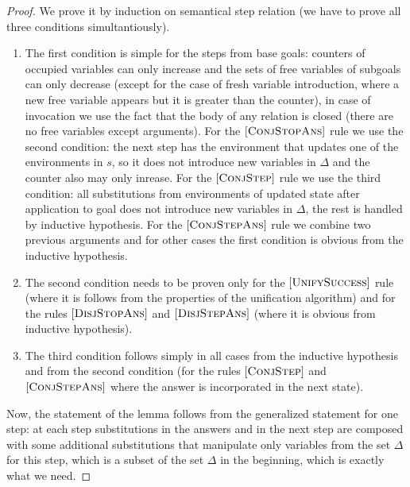 \begin{proof}
We prove it by induction on semantical step relation (we have to prove all three conditions simultantiously).

\begin{enumerate}
\item The first condition is simple for the steps from base goals: counters of occupied variables can only increase and the sets of free variables of subgoals can only decrease (except for the case of fresh variable introduction, where a new free variable appears but it is greater than the counter), in case of invocation we use the fact that the body of any relation is closed (there are no free variables except arguments). For the $\mbox{[\textsc{ConjStopAns}]}$ rule we use the second condition: the next step has the environment that updates one of the environments in $s$, so it does not introduce new variables in $\Delta$ and the counter also may only inrease. For the $\mbox{[\textsc{ConjStep}]}$ rule we use the third condition: all substitutions from environments of updated state after application to goal does not introduce new variables in $\Delta$, the rest is handled by inductive hypothesis. For the $\mbox{[\textsc{ConjStepAns}]}$ rule we combine two previous arguments and for other cases the first condition is obvious from the inductive hypothesis.

\item The second condition needs to be proven only for the $\mbox{[\textsc{UnifySuccess}]}$ rule (where it is follows from the properties of the unification algorithm) and for the rules $\mbox{[\textsc{DisjStopAns}]}$ and $\mbox{[\textsc{DisjStepAns}]}$ (where it is obvious from inductive hypothesis).

\item The third condition follows simply in all cases from the inductive hypothesis and from the second condition (for the rules $\mbox{[\textsc{ConjStep}]}$ and $\mbox{[\textsc{ConjStepAns}]}$ where the answer is incorporated in the next state).
\end{enumerate}

Now, the statement of the lemma follows from the generalized statement for one step: at each step substitutions in the answers and in the next step are composed with some additional substitutions that manipulate only variables from the set $\Delta$ for this step, which is a subset of the set $\Delta$ in the beginning, which is exactly what we need.

\end{proof}

